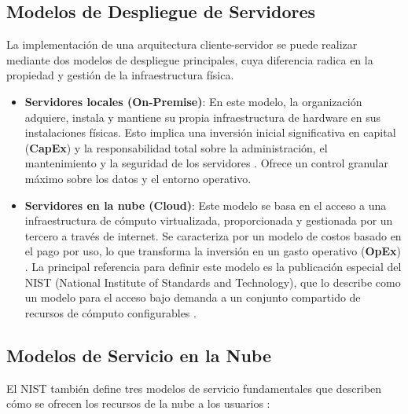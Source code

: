 \subsection{Modelos de Despliegue de Servidores}
\label{subsec:modelos_despliegue_marco}

La implementación de una arquitectura cliente-servidor se puede realizar mediante dos modelos de despliegue principales, cuya diferencia radica en la propiedad y gestión de la infraestructura física.

\begin{itemize}
    \item \textbf{Servidores locales (On-Premise)}: En este modelo, la organización adquiere, instala y mantiene su propia infraestructura de hardware en sus instalaciones físicas. Esto implica una inversión inicial significativa en capital (\textbf{CapEx}) y la responsabilidad total sobre la administración, el mantenimiento y la seguridad de los servidores \cite{Mullins2012}. Ofrece un control granular máximo sobre los datos y el entorno operativo.

    \item \textbf{Servidores en la nube (Cloud)}: Este modelo se basa en el acceso a una infraestructura de cómputo virtualizada, proporcionada y gestionada por un tercero a través de internet. Se caracteriza por un modelo de costos basado en el pago por uso, lo que transforma la inversión en un gasto operativo (\textbf{OpEx}) \cite{softteco2024}. La principal referencia para definir este modelo es la publicación especial del NIST (National Institute of Standards and Technology), que lo describe como un modelo para el acceso bajo demanda a un conjunto compartido de recursos de cómputo configurables \cite{mell2011nist}.
\end{itemize}

\subsection{Modelos de Servicio en la Nube}
\label{subsec:modelos_servicio_nube}

El NIST también define tres modelos de servicio fundamentales que describen cómo se ofrecen los recursos de la nube a los usuarios \cite{mell2011nist}:


